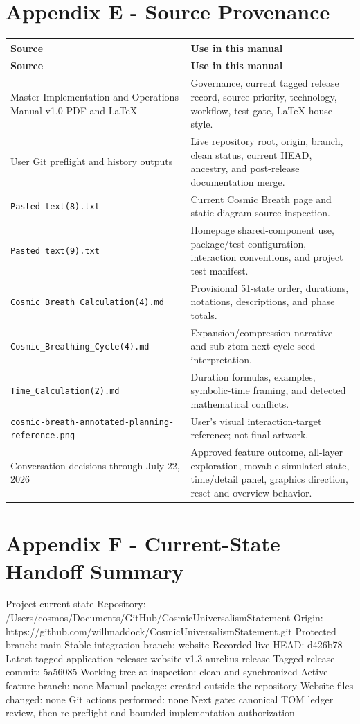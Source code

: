 \documentclass[11pt,letterpaper]{article}
\newcommand{\filepath}[1]{\nolinkurl{#1}}
\begin{document}
\section{Appendix E - Source Provenance}
\begin{longtable}{L{2.7in}L{3.7in}}
\toprule
\textbf{Source} & \textbf{Use in this manual} \\
\midrule
\endfirsthead
\toprule
\textbf{Source} & \textbf{Use in this manual} \\
\midrule
\endhead
Master Implementation and Operations Manual v1.0 PDF and LaTeX & Governance, current tagged release record, source priority, technology, workflow, test gate, LaTeX house style. \\
User Git preflight and history outputs & Live repository root, origin, branch, clean status, current HEAD, ancestry, and post-release documentation merge. \\
\filepath{Pasted text(8).txt} & Current Cosmic Breath page and static diagram source inspection. \\
\filepath{Pasted text(9).txt} & Homepage shared-component use, package/test configuration, interaction conventions, and project test manifest. \\
\filepath{Cosmic_Breath_Calculation(4).md} & Provisional 51-state order, durations, notations, descriptions, and phase totals. \\
\filepath{Cosmic_Breathing_Cycle(4).md} & Expansion/compression narrative and sub-ztom next-cycle seed interpretation. \\
\filepath{Time_Calculation(2).md} & Duration formulas, examples, symbolic-time framing, and detected mathematical conflicts. \\
\filepath{cosmic-breath-annotated-planning-reference.png} & User's visual interaction-target reference; not final artwork. \\
Conversation decisions through July 22, 2026 & Approved feature outcome, all-layer exploration, movable simulated state, time/detail panel, graphics direction, reset and overview behavior. \\
\bottomrule
\end{longtable}

\section{Appendix F - Current-State Handoff Summary}
\begin{codebox}{Project current state}
Repository: /Users/cosmos/Documents/GitHub/CosmicUniversalismStatement
Origin: https://github.com/willmaddock/CosmicUniversalismStatement.git
Protected branch: main
Stable integration branch: website
Recorded live HEAD: d426b78
Latest tagged application release: website-v1.3-aurelius-release
Tagged release commit: 5a56085
Working tree at inspection: clean and synchronized
Active feature branch: none
Manual package: created outside the repository
Website files changed: none
Git actions performed: none
Next gate: canonical TOM ledger review, then re-preflight and bounded implementation authorization
\end{codebox}
\end{document}
